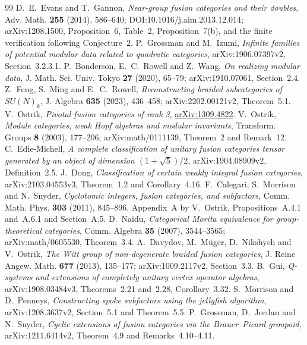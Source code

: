 \documentclass[11pt,reqno]{amsart}
\theoremstyle{definition}
\theoremstyle{remark}
\begin{document}
\begin{thebibliography}{99}
 D.~E.~Evans and T.~Gannon,
\emph{Near-group fusion categories and their doubles},
Adv. Math. \textbf{255} (2014), 586--640;
DOI:10.1016/j.aim.2013.12.014; arXiv:1208.1500,
Proposition~6, Table~2, Proposition~7(b), and the finite verification
following Conjecture~2.
 P.~Grossman and M.~Izumi,
\emph{Infinite families of potential modular data related to quadratic categories},
arXiv:1906.07397v2, Section~3.2.3.1.
 P.~Bonderson, E.~C.~Rowell and Z.~Wang,
\emph{On realizing modular data}, J. Math. Sci. Univ. Tokyo \textbf{27}
(2020), 65--79; arXiv:1910.07061, Section~2.4.
 Z.~Feng, S.~Ming and E.~C.~Rowell,
\emph{Reconstructing braided subcategories of $SU(N)_k$},
J. Algebra \textbf{635} (2023), 436--458; arXiv:2202.00121v2, Theorem~5.1.
 V.~Ostrik,
\emph{Pivotal fusion categories of rank 3},
\href{https://arxiv.org/abs/1309.4822}{arXiv:1309.4822}.
 V.~Ostrik, \emph{Module categories, weak Hopf algebras and modular invariants}, Transform. Groups \textbf{8} (2003), 177--206; arXiv:math/0111139, Theorem~2 and Remark~12.
 C.~Edie-Michell, \emph{A complete classification of unitary fusion categories tensor generated by an object of dimension $(1+\sqrt5)/2$}, arXiv:1904.08909v2, Definition~2.5.
 J.~Dong, \emph{Classification of certain weakly integral fusion categories}, arXiv:2103.04553v3, Theorem~1.2 and Corollary~4.16.
 F.~Calegari, S.~Morrison and N.~Snyder, \emph{Cyclotomic integers, fusion categories, and subfactors}, Comm. Math. Phys. \textbf{303} (2011), 845--896, Appendix~A by V.~Ostrik, Propositions~A.4.1 and~A.6.1 and Section~A.5.
 D.~Naidu, \emph{Categorical Morita equivalence for group-theoretical categories}, Comm. Algebra \textbf{35} (2007), 3544--3565; arXiv:math/0605530, Theorem~3.4.
 A.~Davydov, M.~M\"uger, D.~Nikshych and V.~Ostrik, \emph{The Witt group of non-degenerate braided fusion categories}, J. Reine Angew. Math. \textbf{677} (2013), 135--177; arXiv:1009.2117v2, Section~3.3.
 B.~Gui, \emph{Q-systems and extensions of completely unitary vertex operator algebras}, arXiv:1908.03484v3, Theorems~2.21 and~2.28, Corollary~3.32.
 S.~Morrison and D.~Penneys, \emph{Constructing spoke subfactors using the jellyfish algorithm}, arXiv:1208.3637v2, Section~5.1 and Theorem~5.5.
 P.~Grossman, D.~Jordan and N.~Snyder, \emph{Cyclic extensions of fusion categories via the Brauer--Picard groupoid}, arXiv:1211.6414v2, Theorem~4.9 and Remarks~4.10--4.11.

\end{thebibliography}
\end{document}
